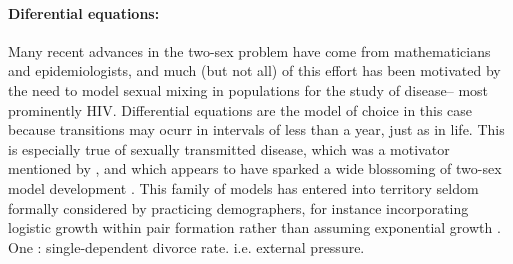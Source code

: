 \paragraph{Diferential equations: } Many recent advances in the two-sex problem
have come from mathematicians and epidemiologists, and much (but not all) of
this effort has been motivated by the need to model sexual mixing in
populations for the study of disease-- most prominently HIV. Differential
equations are the model of choice in this case because transitions may ocurr in
intervals of less than a year, just as in life. This is especially true of
sexually transmitted disease, which was a motivator mentioned by
\citet{hadeler1988models}, and which
appears to have sparked a wide blossoming of two-sex model development
\citep{dietz1988epidemiological,busenberg1991general}.
\citep{ianelli2005gender}
This family of models has entered into
territory seldom formally considered by practicing demographers, for instance 
incorporating logistic growth within pair formation rather than assuming 
exponential growth \citep{castillo1995logistic}.
One 
\citet{blythe1991toward}
\citet{arbogast1989finite}
\citet{martcheva1999exponential}
\citet{martcheva2001mathematics}
\citet{maxin2010two}: single-dependent divorce rate. i.e. external pressure.
\citet{schmitz2000note}
\citet{inaba1992age}
\citet{inaba2011new}
\citep{hadeler1989pair,hadeler1993pair}

